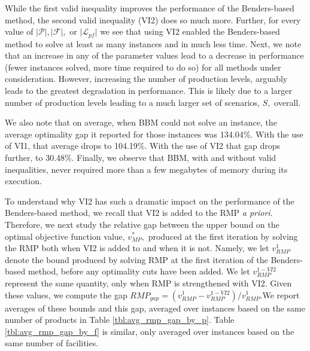 \documentclass[12pt]{article}
\theoremstyle{thmstylethree}%
\begin{document}
While the first valid inequality improves the performance of the Benders-based method, the second valid inequality (VI2) does so much more. Further, for every value of $\vert \mathcal{P} \vert, \vert \mathcal{F} \vert, $ or $\vert \mathcal{L}_{pf} \vert$ we see that using VI2 enabled the Benders-based method to solve at least as many instances and in much less time. Next, we note that an increase in any of the parameter values lead to a decrease in performance (fewer instances solved, more time required to do so) for all methods under consideration. However, increasing the number of production levels, arguably leads to the greatest degradation in performance. This is likely due to a larger number of production levels leading to a much larger set of scenarios, $S,$ overall. 

We also note that on average, when BBM could not solve an instance, the average optimality gap it reported for those instances was 134.04\%. With the use of VI1, that average drops to 104.19\%. With the use of VI2 that gap drops further, to 30.48\%. Finally, we observe that BBM, with and without valid inequalities, never required more than a few megabytes of memory during its execution.

To understand why VI2 has such a dramatic impact on the performance of the Benders-based method, we recall that VI2 is added to the RMP \textit{a priori}. Therefore, we next study the relative gap between the upper bound on the optimal objective function value, $v_{MP}^{*},$ produced at the first iteration by solving the RMP both when VI2 is added to and when it is not. Namely, we let $v_{RMP}^{1}$ denote the bound produced by solving RMP at the first iteration of the Benders-based method, before any optimality cuts have been added. We let $v_{RMP}^{1-VI2}$ represent the same quantity, only when RMP is strengthened with VI2. Given these values, we compute the gap $RMP_{gap} = (v_{RMP}^{1}-v_{RMP}^{1-VI2})/v_{RMP}^{1}.$We report averages of these bounds and this gap, averaged over instances based on the same number of products in Table \ref{tbl:avg_rmp_gap_by_p}. Table \ref{tbl:avg_rmp_gap_by_f} is similar, only averaged over instances based on the same number of facilities. 
\end{document}
